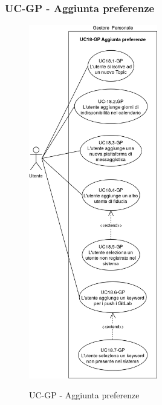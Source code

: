 \subsubsection{UC\theuccount-GP - Aggiunta preferenze}
		\begin{figure}[H]
			\centering
				\includegraphics[width=0.5\textwidth]{img/casi_d'uso/UC18.png}\\
			\caption{UC\theuccount-GP - Aggiunta preferenze}
		\end{figure}
